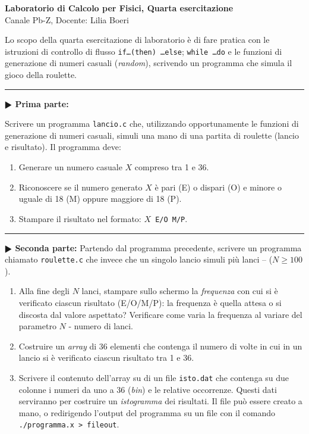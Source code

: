 \documentclass[11pt]{article}
\begin{document}
\pagestyle{empty}

\begin{center}
{\Large \bf  Laboratorio di Calcolo per Fisici, Quarta esercitazione\\[2mm]}
{\large Canale Pb-Z, Docente: Lilia Boeri}
\end{center}
\vspace{4mm}

\begin{mdframed}[backgroundcolor=panna]
  Lo scopo della quarta esercitazione di laboratorio \`e di fare pratica con
  le istruzioni di controllo di flusso \texttt{if\ldots (then) \ldots else}; \texttt{while \ldots do} e le funzioni di generazione di numeri casuali ({\em random}), scrivendo un programma che simula il gioco della roulette.
  \end{mdframed}
%
%



\hrule
\vspace{2mm}
\textbf{$\RHD$ Prima parte:}

Scrivere un programma \texttt{lancio.c} che, utilizzando opportunamente le
funzioni di generazione di numeri casuali, simuli una mano di una partita di
roulette (lancio e risultato). Il programma deve:
\begin{enumerate}
\item Generare un numero casuale $X$ compreso tra 1 e 36.
\item Riconoscere se il numero generato $X$ \`e pari (E) o dispari (O) e minore
o uguale di 18 (M) oppure maggiore di 18 (P).
\item Stampare il risultato nel formato: \texttt{$X$ E/O M/P}.
\end{enumerate}

\hrule
\vspace{2mm}
\textbf{$\RHD$ Seconda parte:}
Partendo dal programma precedente, scrivere un programma chiamato \texttt{roulette.c} che
invece che un singolo lancio simuli pi\`u lanci --  ($N \ge 100$).
\begin{enumerate}
\item Alla fine degli $N$ lanci, stampare sullo schermo la {\em frequenza}
con cui si \`e verificato ciascun risultato (E/O/M/P): la frequenza
\`e quella attesa o si discosta dal valore aspettato? Verificare come
varia la frequenza al variare del parametro $N$ - numero di lanci.
\item Costruire un {\em array} di 36 elementi che contenga il numero di
volte in cui  in un lancio  si \`e verificato ciascun risultato tra 1 e 36.
\item Scrivere il contenuto dell'array su di un file
  \texttt{isto.dat} che contenga
su due colonne i numeri da uno a 36 ({\em bin}) e le relative occorrenze.
Questi dati serviranno per costruire un {\em istogramma} dei risultati.
Il file pu\`o essere creato a mano, o redirigendo l'output del programma
su un file con il comando \texttt{./programma.x > fileout}.
\end{enumerate}
\end{document}

